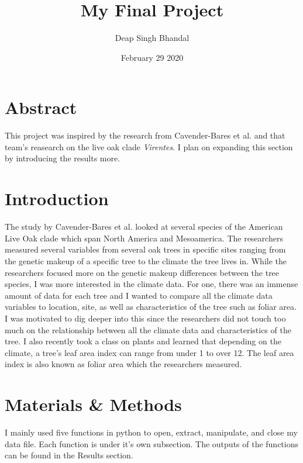 \documentclass[letterpaper]{article}
\title{My Final Project}
\author{Deap Singh Bhandal}
\date{February 29 2020}
\begin{document}
\maketitle
\section*{Abstract}
This project was inspired by the research from Cavender-Bares et al. and that team's reasearch on the live oak clade {\it Virentes}. I plan on expanding this section by introducing the results more. 

\newpage
\tableofcontents
\listoffigures
\newpage

\section{Introduction}
The study by Cavender-Bares et al. looked at several species of the American Live Oak clade which span North America and Mesoamerica. The researchers measured several variables from several oak trees in specific sites ranging from the genetic makeup of a specific tree to the climate the tree lives in\cite{cavender2004multiple}. While the researchers focused more on the genetic makeup differences between the tree species, I was more interested in the climate data. For one, there was an immense amount of data for each tree and I wanted to compare all the climate data variables to location, site, as well as characteristics of the tree such as foliar area. 
I was motivated to dig deeper into this since the researchers did not touch too much on the relationship between all the climate data and characteristics of the tree. I also recently took a class on plants and learned that depending on the climate, a tree’s leaf area index can range from under 1 to over 12\cite{jolly2005generalized}. The leaf area index is also known as foliar area which the researchers measured.

\section{Materials \& Methods}
I mainly used five functions in python to open, extract, manipulate, and close my data file. Each function is under it's own subsection. The outputs of the functions can be found in the Results section.
\end{document}
